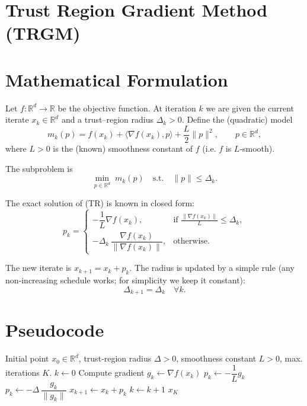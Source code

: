 \documentclass{article}
\newcommand{\R}{\mathbb{R}}
\begin{document}
\section*{Trust Region Gradient Method (TRGM)}

\section*{Mathematical Formulation}
Let $f:\R^{d}\rightarrow\R$ be the objective function.  
At iteration $k$ we are given the current iterate $x_k\in\R^{d}$ and a trust–region radius $\Delta_k>0$.  
Define the (quadratic) model
\[
m_k(p)=f(x_k)+\langle \nabla f(x_k),p\rangle+\frac{L}{2}\|p\|^{2},
\qquad p\in\R^{d},
\]
where $L>0$ is the (known) smoothness constant of $f$ (i.e. $f$ is $L$‑smooth).  

The subproblem is
\[
\min_{p\in\R^{d}}\; m_k(p)\quad\text{s.t.}\quad \|p\|\le \Delta_k .
\tag{TR}
\]

The exact solution of (TR) is known in closed form:
\[
p_k=
\begin{cases}
-\dfrac{1}{L}\nabla f(x_k), & \text{if }\displaystyle\frac{\|\nabla f(x_k)\|}{L}\le \Delta_k,\\[2ex]
-\displaystyle\Delta_k\,\dfrac{\nabla f(x_k)}{\|\nabla f(x_k)\|}, & \text{otherwise.}
\end{cases}
\tag{1}
\]

The new iterate is $x_{k+1}=x_k+p_k$.  
The radius is updated by a simple rule (any non‑increasing schedule works; for simplicity we keep it constant):
\[
\Delta_{k+1}=\Delta_k\quad\forall k .
\tag{2}
\]

\section*{Pseudocode}
\begin{algorithm}[H]
\caption{Trust Region Gradient Method}
\begin{algorithmic}[1]
\Require Initial point $x_0\in\R^{d}$, trust‑region radius $\Delta>0$, smoothness constant $L>0$, max. iterations $K$.
\State $k\gets 0$
    \State Compute gradient $g_k\gets \nabla f(x_k)$
        \State $p_k \gets -\dfrac{1}{L}g_k$ 
    \Else
        \State $p_k \gets -\Delta\,\dfrac{g_k}{\|g_k\|}$ 
    \EndIf
    \State $x_{k+1}\gets x_k + p_k$
    \State $k\gets k+1$
\EndWhile
\State \Return $x_K$
\end{algorithmic}
\end{algorithm}
\end{document}
